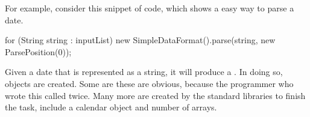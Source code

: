 For example, consider this snippet of code, which
shows a easy way to parse a date.
\begin{shortlisting}
	for (String string : inputList) {
		new SimpleDataFormat().parse(string, new ParsePosition(0));
	}
\end{shortlisting}
Given a date that is
represented as a string, it will produce a . In doing so,
objects are created. Some are these are obvious, because the programmer who
wrote this called  twice. Many more are created by the standard
libraries to finish the task, include a calendar object and number of arrays. 

\begin{figure}
	\centering
\end{figure}
